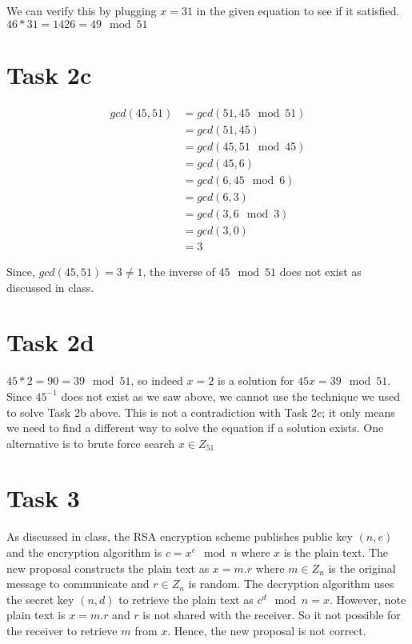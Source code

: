 \documentclass{article}
\begin{document}
    We can verify this by plugging $x = 31$ in the given equation to see if it satisfied. $46*31 = 1426 = 49 \mod 51$

    \section*{Task 2c}
    \begin{align*}
        gcd(45, 51) & = gcd(51, 45 \mod 51) \\
                    & = gcd(51, 45) \\
                    & = gcd(45, 51 \mod 45) \\
                    & = gcd(45, 6) \\
                    & = gcd(6, 45 \mod 6) \\
                    & = gcd(6, 3) \\
                    & = gcd(3, 6 \mod 3) \\
                    & = gcd(3, 0) \\
                    & = 3
    \end{align*}

    Since, $gcd(45, 51) = 3 \ne 1$, the inverse of $45 \mod 51$ does not exist as discussed in class.

    \section*{Task 2d}
    $45*2 = 90 = 39 \mod 51$, so indeed $x = 2$ is a solution for $45x = 39 \mod 51$. Since $45^{-1}$ does not exist as we saw above, we cannot use the technique we used to solve Task 2b above. This is not a contradiction with Task 2c; it only means we need to find a different way to solve the equation if a solution exists. One alternative is to brute force search $x \in Z_{51}$

    \section*{Task 3}
    As discussed in class, the RSA encryption scheme publishes public key $(n, e)$ and the encryption algorithm is $c = x^e \mod n$ where $x$ is the plain text. The new proposal constructs the plain text as $x = m.r$ where $m \in Z_n$ is the original message to communicate and $r \in Z_n$ is random. The decryption algorithm uses the secret key $(n, d)$ to retrieve the plain text as $c^d \mod n = x$. However, note plain text is $x = m.r$ and $r$ is not shared with the receiver. So it not possible for the receiver to retrieve $m$ from $x$. Hence, the new proposal is not correct.
\end{document}
